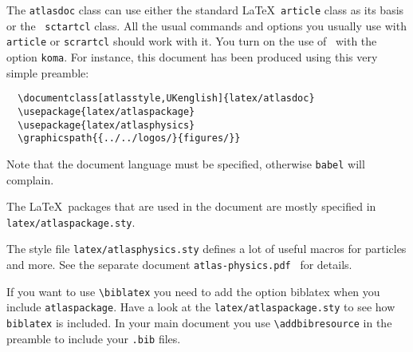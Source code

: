 \documentclass[atlasstyle,UKenglish]{latex/atlasdoc}
\newcommand{\Macro}[1]{\texttt{\textbackslash #1}\xspace}
\newcommand{\Option}[1]{\textsf{#1}\xspace}
\begin{document}
The \texttt{atlasdoc} class can use either the standard \LaTeX\ \texttt{article} class
as its basis or the \KOMAScript\ \texttt{sctartcl} class.
All the usual commands and options you usually use
with \texttt{article}  or \texttt{scrartcl} should work with it. 
You turn on the use of \KOMAScript\ with the option \texttt{koma}.
For instance, this document has
been produced using this very simple preamble:
%
\begin{verbatim}
  \documentclass[atlasstyle,UKenglish]{latex/atlasdoc}
  \usepackage{latex/atlaspackage}
  \usepackage{latex/atlasphysics}
  \graphicspath{{../../logos/}{figures/}}
\end{verbatim}
%
Note that the document language must be specified, otherwise \texttt{babel} will complain.

The \LaTeX\ packages that are used in the document are mostly specified in 
\texttt{latex/atlaspackage.sty}.

The style file \texttt{latex/atlasphysics.sty} defines a lot of useful
macros for particles and more. See the separate document
\texttt{atlas-physics.pdf}~\cite{atlas-physics} for details.

If you want to use \Macro{biblatex} you need to add the option \Option{biblatex} when you
include \texttt{atlaspackage}.
Have a look at the \texttt{latex/atlaspackage.sty} to see how \texttt{biblatex} is included.
In your main document you use \Macro{addbibresource} in the preamble to include your \texttt{.bib} files.
\end{document}
